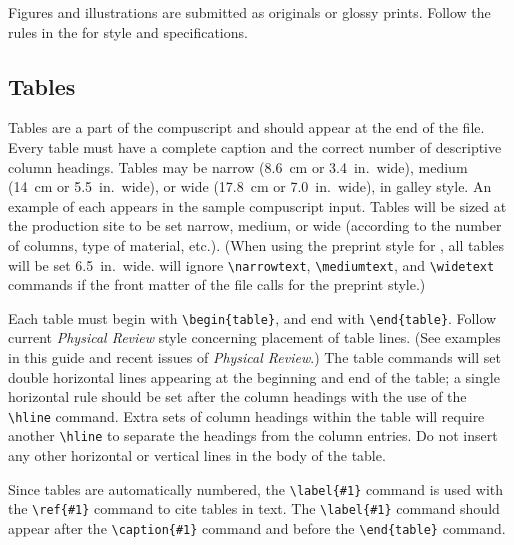 Figures and illustrations are submitted as originals or glossy prints.
Follow the rules in the \SNG{}  for style and specifications.

\subsection{Tables}
\label{sec:tables}

Tables are a part of the compuscript and should appear at the end of the
file.  Every table must have a complete caption and the correct number of
descriptive column headings.  Tables may be narrow (8.6~cm or 3.4~in.\
wide), medium (14~cm or 5.5~in.\ wide), or wide (17.8~cm or  7.0~in.\
wide), in galley style. An example of each appears in the sample
compuscript input. Tables will be sized at the production site to be set
narrow, medium, or wide (according to the number of columns, type of
material, etc.). (When using the preprint style for \REVTeX{}, all tables
will be set 6.5~in.\ wide.  \REVTeX{} will ignore \verb+\narrowtext+,
\verb+\mediumtext+, and \verb+\widetext+ commands if the front matter of
the file calls for the preprint style.)

Each table must begin with \verb+\begin{table}+, and end with
\verb+\end{table}+. Follow current {\em Physical Review\/} style concerning
placement of table lines.  (See examples in this guide and recent issues of
{\em Physical Review}.)  The table commands will set double horizontal
lines appearing at the beginning and end of the table; a single horizontal
rule should be set after the column headings with the use of the
\verb+\hline+ command. Extra sets of column headings within the table will
require another \verb+\hline+ to separate the headings from the column
entries. Do not insert any other horizontal or vertical lines in the body
of the table.

Since tables are automatically numbered, the \verb+\label{#1}+ command is
used with the \verb+\ref{#1}+ command to cite tables in text.  The
\verb+\label{#1}+ command should appear after the \verb+\caption{#1}+
command and before the \verb+\end{table}+ command.
\bigskip

